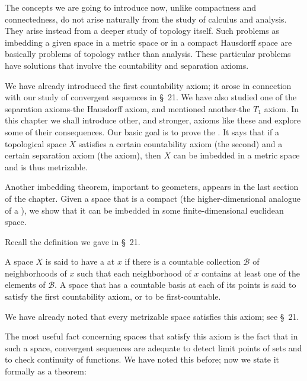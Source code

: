 
The concepts we are going to introduce now, unlike compactness and connectedness, do not arise naturally from the study of calculus and analysis. They arise instead from a deeper study of topology itself. Such problems as imbedding a given space in a metric space or in a compact Hausdorff space are basically problems of topology rather than analysis. These particular problems have solutions that involve the countability and separation axioms.

We have already introduced the first countability axiom; it arose in connection with our study of convergent sequences in \S\ 21. We have also studied one of the separation axioms-the Hausdorff axiom, and mentioned another-the \(T_{1}\) axiom. In this chapter we shall introduce other, and stronger, axioms like these and explore some of their consequences. Our basic goal is to prove the . It says that if a topological space \(X\) satisfies a certain countability axiom (the second) and a certain separation axiom (the  axiom), then \(X\) can be imbedded in a metric space and is thus metrizable.

Another imbedding theorem, important to geometers, appears in the last section of the chapter. Given a space that is a compact  (the higher-dimensional analogue of a ), we show that it can be imbedded in some finite-dimensional euclidean space.


Recall the definition we gave in \S\ 21.

\begin{definition}
 A space \(X\) is said to have a  at \(x\) if there is a countable collection \(\mathcal{B}\) of neighborhoods of \(x\) such that each neighborhood of \(x\) contains at least one of the elements of \(\mathcal{B}\). A space that has a countable basis at each of its points is said to satisfy the first countability axiom, or to be first-countable.
\end{definition}

We have already noted that every metrizable space satisfies this axiom; see \S\ 21.

The most useful fact concerning spaces that satisfy this axiom is the fact that in such a space, convergent sequences are adequate to detect limit points of sets and to check continuity of functions. We have noted this before; now we state it formally as a theorem:

